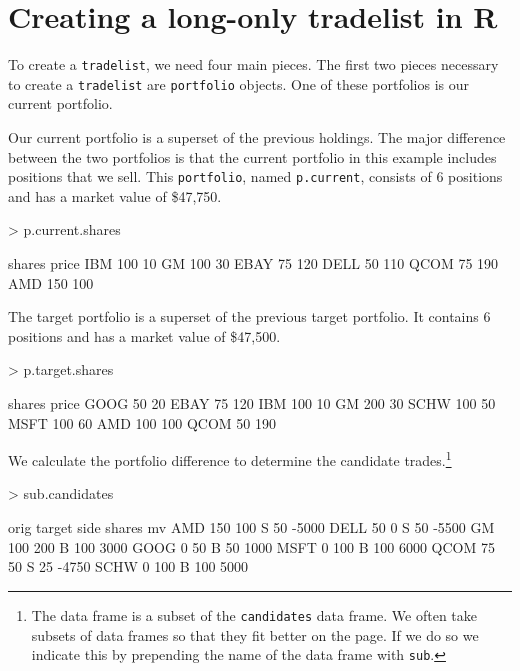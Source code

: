\documentclass{article}
\begin{document}
\section{Creating a long-only tradelist in R}
\label{a long-only tradelist}




To create a \texttt{tradelist}, we need four main pieces.  The first
two pieces necessary to create a \texttt{tradelist} are
\texttt{portfolio} objects.  One of these portfolios is our current
portfolio.

Our current portfolio is a superset of the previous holdings.  The
major difference between the two portfolios is that the current
portfolio in this example includes positions that we sell.  This
\texttt{portfolio}, named \texttt{p.current}, consists of
6 positions and has a market value of
\$47,750.


\begin{Schunk}
\begin{Sinput}
> p.current.shares
\end{Sinput}
\begin{Soutput}
     shares price
IBM     100    10
GM      100    30
EBAY     75   120
DELL     50   110
QCOM     75   190
AMD     150   100
\end{Soutput}
\end{Schunk}

The target portfolio is a superset of the previous target portfolio.
It contains 6 positions and has a market
value of \$47,500.


\begin{Schunk}
\begin{Sinput}
> p.target.shares
\end{Sinput}
\begin{Soutput}
     shares price
GOOG     50    20
EBAY     75   120
IBM     100    10
GM      200    30
SCHW    100    50
MSFT    100    60
AMD     100   100
QCOM     50   190
\end{Soutput}
\end{Schunk}

We calculate the portfolio difference to determine the candidate
trades.\protect\footnote{The data frame is a subset of the
\texttt{candidates} data frame.  We often take subsets of data frames
so that they fit better on the page.  If we do so we indicate this by
prepending the name of the data frame with \texttt{sub}.}


\begin{Schunk}
\begin{Sinput}
> sub.candidates
\end{Sinput}
\begin{Soutput}
     orig target side shares    mv
AMD   150    100    S     50 -5000
DELL   50      0    S     50 -5500
GM    100    200    B    100  3000
GOOG    0     50    B     50  1000
MSFT    0    100    B    100  6000
QCOM   75     50    S     25 -4750
SCHW    0    100    B    100  5000
\end{Soutput}
\end{Schunk}
\end{document}
